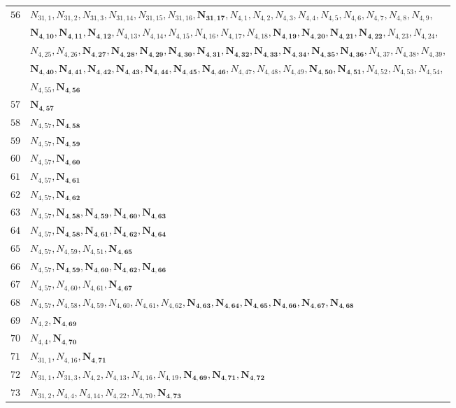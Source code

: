 \documentclass{amsart}
\theoremstyle{plain}
\theoremstyle{definition}
\theoremstyle{remark}
\begin{document}
{\begin{longtable}{ll}
$56$ & $N_{31,1}, N_{31,2}, N_{31,3}, N_{31,14}, N_{31,15}, N_{31,16}, \bm{N_{31,17}}, N_{4,1}, N_{4,2}, N_{4,3}, N_{4,4}, N_{4,5}, N_{4,6}, N_{4,7}, N_{4,8}, N_{4,9}$,\\ 
& $\bm{N_{4,10}}, \bm{N_{4,11}}, \bm{N_{4,12}}, N_{4,13}, N_{4,14}, N_{4,15}, N_{4,16}, N_{4,17}, N_{4,18}, \bm{N_{4,19}}, \bm{N_{4,20}}, \bm{N_{4,21}}, \bm{N_{4,22}}, N_{4,23}, N_{4,24}$,\\ 
& $N_{4,25}, N_{4,26}, \bm{N_{4,27}}, \bm{N_{4,28}}, \bm{N_{4,29}}, \bm{N_{4,30}}, \bm{N_{4,31}}, \bm{N_{4,32}}, \bm{N_{4,33}}, \bm{N_{4,34}}, \bm{N_{4,35}}, \bm{N_{4,36}}, N_{4,37}, N_{4,38}, N_{4,39}$,\\ 
& $\bm{N_{4,40}}, \bm{N_{4,41}}, \bm{N_{4,42}}, \bm{N_{4,43}}, \bm{N_{4,44}}, \bm{N_{4,45}}, \bm{N_{4,46}}, N_{4,47}, N_{4,48}, N_{4,49}, \bm{N_{4,50}}, \bm{N_{4,51}}, N_{4,52}, N_{4,53}, N_{4,54}$,\\ 
& $N_{4,55}, \bm{N_{4,56}}$\\
$57$ & $\bm{N_{4,57}}$\\
$58$ & $N_{4,57}, \bm{N_{4,58}}$\\
$59$ & $N_{4,57}, \bm{N_{4,59}}$\\
$60$ & $N_{4,57}, \bm{N_{4,60}}$\\
$61$ & $N_{4,57}, \bm{N_{4,61}}$\\
$62$ & $N_{4,57}, \bm{N_{4,62}}$\\
$63$ & $N_{4,57}, \bm{N_{4,58}}, \bm{N_{4,59}}, \bm{N_{4,60}}, \bm{N_{4,63}}$\\
$64$ & $N_{4,57}, \bm{N_{4,58}}, \bm{N_{4,61}}, \bm{N_{4,62}}, \bm{N_{4,64}}$\\
$65$ & $N_{4,57}, N_{4,59}, N_{4,51}, \bm{N_{4,65}}$\\
$66$ & $N_{4,57}, \bm{N_{4,59}}, \bm{N_{4,60}}, \bm{N_{4,62}}, \bm{N_{4,66}}$\\
$67$ & $N_{4,57}, N_{4,60}, N_{4,61}, \bm{N_{4,67}}$\\
$68$ & %
$N_{4,57}, N_{4,58}, N_{4,59}, N_{4,60}, N_{4,61}, N_{4,62}, \bm{N_{4,63}}, \bm{N_{4,64}}, \bm{N_{4,65}}, \bm{N_{4,66}}, \bm{N_{4,67}}, \bm{N_{4,68}}$\\
$69$ & $N_{4,2}, \bm{N_{4,69}}$\\
$70$ & $N_{4,4}, \bm{N_{4,70}}$\\
$71$ & $N_{31,1}, N_{4,16}, \bm{N_{4,71}}$\\
$72$ & $N_{31,1}, N_{31,3}, N_{4,2}, N_{4,13}, N_{4,16}, N_{4,19}, \bm{N_{4,69}}, \bm{N_{4,71}}, \bm{N_{4,72}}$\\
$73$ & $N_{31,2}, N_{4,4}, N_{4,14}, N_{4,22}, N_{4,70}, \bm{N_{4,73}}$\\

\end{longtable}}
\end{document}
